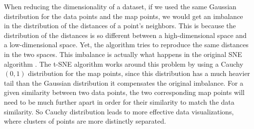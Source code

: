 \documentclass[11pt]{article}
\theoremstyle{definition}
\theoremstyle{remark}
\begin{document}
When reducing the dimensionality of a dataset, if we used the same Gaussian distribution for the data points and the map points, we would get an imbalance in the distribution of the distances of a point's neighbors. This is because the distribution of the distances is so different between a high-dimensional space and a low-dimensional space. Yet, the algorithm tries to reproduce the same distances in the two spaces. This imbalance is actually what happens in the original SNE algorithm \cite{hinton2003stochastic}.
The t-SNE algorithm works around this problem by using a Cauchy $(0,1)$ distribution for the map points, since this distribution has a much heavier tail than the Gaussian distribution it compensates the original imbalance. For a given similarity between two data points, the two corresponding map points will need to be much further apart in order for their similarity to match the data similarity. So Cauchy distribution leads to more effective data visualizations, where clusters of points are more distinctly separated.

\end{document}
